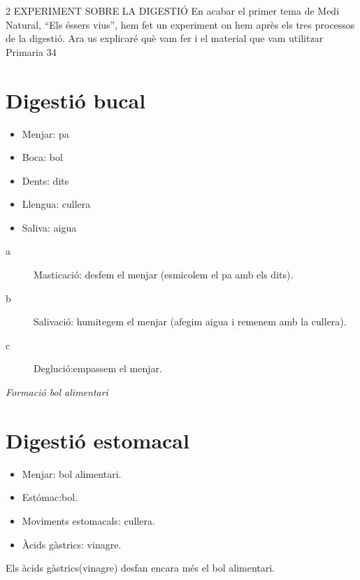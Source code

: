 %
%
\begin{news}
{2} %
{EXPERIMENT SOBRE LA DIGESTIÓ}
{En acabar el primer tema de Medi Natural, “Els éssers vius”, hem fet un experiment on hem après els tres processos de la digestió. Ara us explicaré què vam fer i el  material que vam utilitzar}
{Primaria}
{34}

\section{Digestió bucal}

	\begin{itemize}
		\item Menjar: pa
		\item Boca: bol
		\item Dents: dits
		\item Llengua: cullera
		\item Saliva: aigua
	\end{itemize}

	\begin{description}
	\item[a] Masticació: desfem el menjar (esmicolem el pa amb els dits).
	\item[b] Salivació: humitegem el menjar (afegim aigua i remenem amb la cullera).
	\item[c] Deglució:empassem el menjar.
	\end{description}

\emph{Formació bol alimentari}


\section{Digestió estomacal}

	\begin{itemize}
        \item Menjar: bol alimentari.
        \item Estómac:bol.
        \item Moviments estomacals: cullera.
        \item Àcids gàstrics: vinagre.
	\end{itemize}

	Els àcids gàstrics(vinagre) desfan encara més el bol alimentari.


\end{news}
